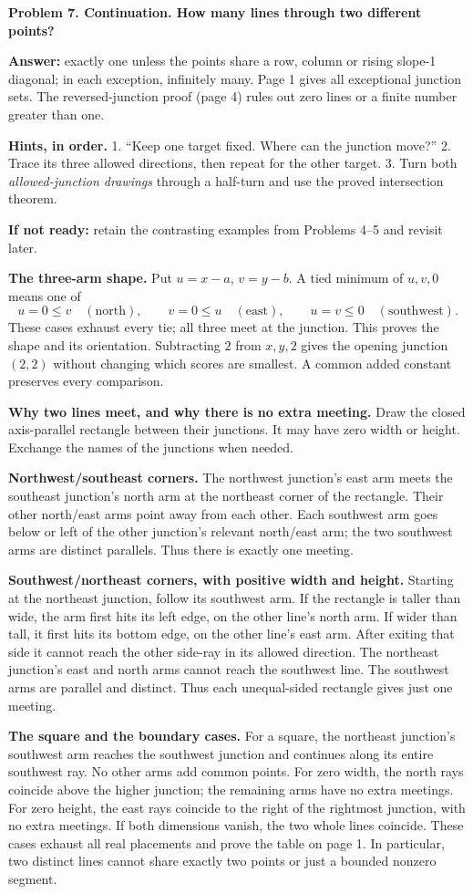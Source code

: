 \documentclass[11pt,letterpaper]{article}
\newcommand{\head}[1]{\par\vspace{4pt}{\large\bfseries #1}\par\vspace{1pt}}
\newcommand{\prob}[2]{\par\vspace{4pt}\textbf{Problem #1. #2}\par}
\newcommand{\hints}[1]{\par\textbf{Hints, in order.} #1\par}
\begin{document}
\prob{7}{Continuation. How many lines through two different points?}
\textbf{Answer:} exactly one unless the points share a row, column or rising slope-1 diagonal; in each exception, infinitely many. Page 1 gives all exceptional junction sets. The reversed-junction proof (page 4) rules out zero lines or a finite number greater than one.
\hints{1. ``Keep one target fixed. Where can the junction move?'' 2. Trace its three allowed directions, then repeat for the other target. 3. Turn both \emph{allowed-junction drawings} through a half-turn and use the proved intersection theorem.}
\textbf{If not ready:} retain the contrasting examples from Problems 4--5 and revisit later.
\newpage
\head{The mathematics behind the answers}
\textbf{The three-arm shape.} Put $u=x-a$, $v=y-b$. A tied minimum of $u,v,0$ means one of
\[
 u=0\leq v\quad(\text{north}),\qquad
 v=0\leq u\quad(\text{east}),\qquad
 u=v\leq0\quad(\text{southwest}).
\]
These cases exhaust every tie; all three meet at the junction. This proves the shape and its orientation. Subtracting $2$ from $x,y,2$ gives the opening junction $(2,2)$ without changing which scores are smallest. A common added constant preserves every comparison.

\textbf{Why two lines meet, and why there is no extra meeting.} Draw the closed axis-parallel rectangle between their junctions. It may have zero width or height. Exchange the names of the junctions when needed.

\textbf{Northwest/southeast corners.} The northwest junction's east arm meets the southeast junction's north arm at the northeast corner of the rectangle. Their other north/east arms point away from each other. Each southwest arm goes below or left of the other junction's relevant north/east arm; the two southwest arms are distinct parallels. Thus there is exactly one meeting.

\textbf{Southwest/northeast corners, with positive width and height.} Starting at the northeast junction, follow its southwest arm. If the rectangle is taller than wide, the arm first hits its left edge, on the other line's north arm. If wider than tall, it first hits its bottom edge, on the other line's east arm. After exiting that side it cannot reach the other side-ray in its allowed direction. The northeast junction's east and north arms cannot reach the southwest line. The southwest arms are parallel and distinct. Thus each unequal-sided rectangle gives just one meeting.

\textbf{The square and the boundary cases.} For a square, the northeast junction's southwest arm reaches the southwest junction and continues along its entire southwest ray. No other arms add common points. For zero width, the north rays coincide above the higher junction; the remaining arms have no extra meetings. For zero height, the east rays coincide to the right of the rightmost junction, with no extra meetings. If both dimensions vanish, the two whole lines coincide. These cases exhaust all real placements and prove the table on page 1. In particular, two distinct lines cannot share exactly two points or just a bounded nonzero segment.
\end{document}
